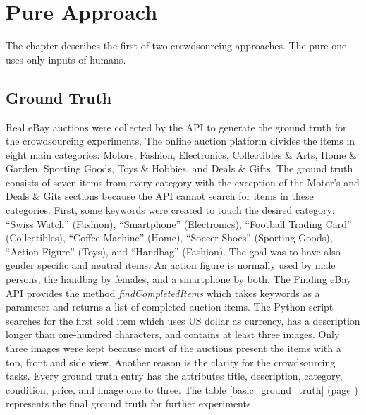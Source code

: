 \section{Pure Approach}
The chapter describes the first of two crowdsourcing approaches. The pure one uses only inputs of humans.
\subsection{Ground Truth}
\label{ground_truth}
Real eBay auctions were collected by the API to generate the ground truth for the crowdsourcing experiments. The online auction platform divides the items in eight main categories: Motors, Fashion, Electronics, Collectibles \& Arts, Home \& Garden, Sporting Goods, Toys \& Hobbies, and Deals \& Gifts. The ground truth consists of seven items from every category with the exception of the Motor's and Deals \& Gits sections because the API cannot search for items in these categories. First, some keywords were created to touch the desired category: ``Swiss Watch'' (Fashion), ``Smartphone'' (Electronics), ``Football Trading Card'' (Collectibles), ``Coffee Machine'' (Home), ``Soccer Shoes'' (Sporting Goods), ``Action Figure'' (Toys), and ``Handbag'' (Fashion). The goal was to have also gender specific and neutral items. An action figure is normally used by male persons, the handbag by females, and a smartphone by both. The Finding eBay API provides the method \textit{findCompletedItems} which takes keywords as a parameter and returns a list of completed auction items. The Python script searches for the first sold item which uses US dollar as currency, has a description longer than one-hundred characters, and contains at least three images. Only three images were kept because most of the auctions present the items with a top, front and side view. Another reason is the clarity for the crowdsourcing tasks. Every ground truth entry has the attributes title, description, category, condition, price, and image one to three. The table \ref{basic_ground_truth} (page \pageref{basic_ground_truth}) represents the final ground truth for further experiments.

